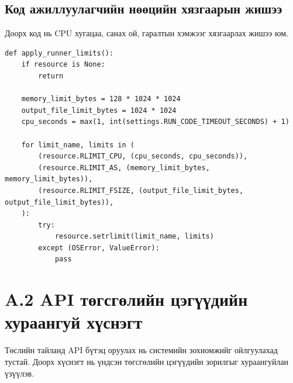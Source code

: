 \subsection*{Код ажиллуулагчийн нөөцийн хязгаарын жишээ}
Доорх код нь CPU хугацаа, санах ой, гаралтын хэмжээг хязгаарлах жишээ юм.

\begin{lstlisting}
def apply_runner_limits():
    if resource is None:
        return

    memory_limit_bytes = 128 * 1024 * 1024
    output_file_limit_bytes = 1024 * 1024
    cpu_seconds = max(1, int(settings.RUN_CODE_TIMEOUT_SECONDS) + 1)

    for limit_name, limits in (
        (resource.RLIMIT_CPU, (cpu_seconds, cpu_seconds)),
        (resource.RLIMIT_AS, (memory_limit_bytes, memory_limit_bytes)),
        (resource.RLIMIT_FSIZE, (output_file_limit_bytes, output_file_limit_bytes)),
    ):
        try:
            resource.setrlimit(limit_name, limits)
        except (OSError, ValueError):
            pass
\end{lstlisting}

\section*{A.2 API төгсгөлийн цэгүүдийн хураангуй хүснэгт}
Төслийн тайланд API бүтэц оруулах нь системийн зохиомжийг ойлгуулахад тустай. Доорх хүснэгт нь үндсэн төгсгөлийн цэгүүдийн зорилгыг хураангуйлан үзүүлэв.

